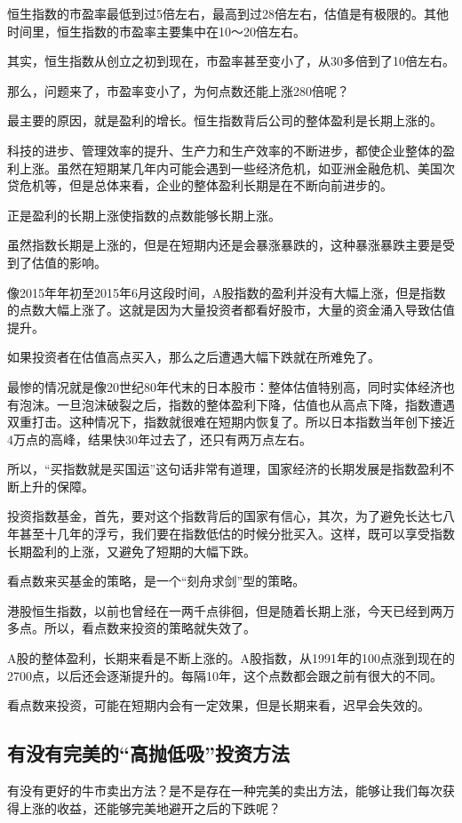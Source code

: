 恒生指数的市盈率最低到过5倍左右，最高到过28倍左右，估值是有极限的。其他时间里，恒生指数的市盈率主要集中在10～20倍左右。

其实，恒生指数从创立之初到现在，市盈率甚至变小了，从30多倍到了10倍左右。

那么，问题来了，市盈率变小了，为何点数还能上涨280倍呢？

最主要的原因，就是盈利的增长。恒生指数背后公司的整体盈利是长期上涨的。

科技的进步、管理效率的提升、生产力和生产效率的不断进步，都使企业整体的盈利上涨。虽然在短期某几年内可能会遇到一些经济危机，如亚洲金融危机、美国次贷危机等，但是总体来看，企业的整体盈利长期是在不断向前进步的。

正是盈利的长期上涨使指数的点数能够长期上涨。

虽然指数长期是上涨的，但是在短期内还是会暴涨暴跌的，这种暴涨暴跌主要是受到了估值的影响。

像2015年年初至2015年6月这段时间，A股指数的盈利并没有大幅上涨，但是指数的点数大幅上涨了。这就是因为大量投资者都看好股市，大量的资金涌入导致估值提升。

如果投资者在估值高点买入，那么之后遭遇大幅下跌就在所难免了。

最惨的情况就是像20世纪80年代末的日本股市：整体估值特别高，同时实体经济也有泡沫。一旦泡沫破裂之后，指数的整体盈利下降，估值也从高点下降，指数遭遇双重打击。这种情况下，指数就很难在短期内恢复了。所以日本指数当年创下接近4万点的高峰，结果快30年过去了，还只有两万点左右。

所以，“买指数就是买国运”这句话非常有道理，国家经济的长期发展是指数盈利不断上升的保障。

投资指数基金，首先，要对这个指数背后的国家有信心，其次，为了避免长达七八年甚至十几年的浮亏，我们要在指数低估的时候分批买入。这样，既可以享受指数长期盈利的上涨，又避免了短期的大幅下跌。

看点数来买基金的策略，是一个“刻舟求剑”型的策略。

港股恒生指数，以前也曾经在一两千点徘徊，但是随着长期上涨，今天已经到两万多点。所以，看点数来投资的策略就失效了。

A股的整体盈利，长期来看是不断上涨的。A股指数，从1991年的100点涨到现在的2700点，以后还会逐渐提升的。每隔10年，这个点数都会跟之前有很大的不同。

看点数来投资，可能在短期内会有一定效果，但是长期来看，迟早会失效的。

\subsection{有没有完美的“高抛低吸”投资方法}
{\kaishu 有没有更好的牛市卖出方法？是不是存在一种完美的卖出方法，能够让我们每次获得上涨的收益，还能够完美地避开之后的下跌呢？}

